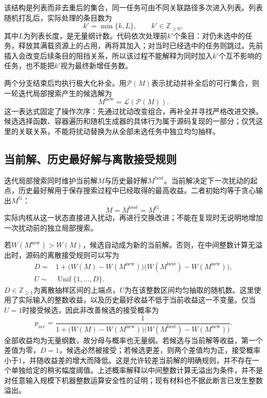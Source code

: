 该结构是列表而非去重后的集合，同一任务可由不同关联路径多次进入列表。列表随机打乱后，实际处理的条目数为
\begin{equation}
 k'=\min\{k,L\},
 \qquad k'\in\mathbb{Z}_{\geq0},
 \label{s0303:perturb_length}
\end{equation}
其中$L$为列表长度，是无量纲计数。代码依次处理前$k'$个条目：对仍未选中的任务，释放其满载资源上的占用，再将其加入；对当时已经选中的任务则跳过。先前插入会改变后续条目的阻挡关系，所以该过程不能解释为同时加入$k'$个互不影响的任务，也不能把$k'$视为最终新增任务数。

两个分支结束后均执行极大化补全。用$\mathcal{P}(M)$表示扰动并补全后的可行集合，则一轮迭代局部搜索产生的候选解为
\begin{equation}
 M^{\mathrm{new}}=\mathcal{L}(\mathcal{P}(M)).
 \label{s0303:ils_candidate}
\end{equation}
这一表达式固定了操作次序：先通过扰动改变组合，再补全并寻找严格改进交换。候选选择函数、容器遍历和随机生成器的具体行为属于源码复现的一部分；仅凭这里的关联关系，不能将扰动替换为从全部未选任务中独立均匀抽样。

\subsection{当前解、历史最好解与离散接受规则}

迭代局部搜索同时维护当前解$M$与历史最好解$M^{\mathrm{best}}$。当前解决定下一次扰动的起点，历史最好解用于保存搜索过程中已经取得的最高收益。二者初始均等于贪心输出$M^{\mathrm{G}}$：
\begin{equation}
 M=M^{\mathrm{best}}=M^{\mathrm{G}}.
 \label{s0303:initial_states}
\end{equation}
实际内核从这一状态直接进入扰动，再进行交换改进；不能在复现时无说明地增加一次扰动前的独立局部搜索。

若$W(M^{\mathrm{new}})>W(M)$，候选自动成为新的当前解。否则，在中间整数计算无溢出时，源码的离散接受规则可以写为
\begin{align}
 D={}&1+\bigl(W(M)-W(M^{\mathrm{new}})\bigr)
          \bigl(W(M^{\mathrm{best}})-W(M^{\mathrm{new}})\bigr),
 \label{s0303:accept_denominator}\\
 U\sim{}&\operatorname{Unif}\{1,\ldots,D\}.
 \label{s0303:accept_draw}
\end{align}
$D\in\mathbb{Z}_{\geq1}$为离散抽样区间的上端点，$U$为在该整数区间均匀抽取的随机数。这里使用了实际输入的整数收益，以及历史最好收益不低于当前收益这一不变量。仅当$U=1$时接受候选，因此非改善候选的接受概率为
\begin{equation}
 p_{\mathrm{acc}}=
 \frac{1}{1+\bigl(W(M)-W(M^{\mathrm{new}})\bigr)
                \bigl(W(M^{\mathrm{best}})-W(M^{\mathrm{new}})\bigr)}.
 \label{s0303:accept_probability}
\end{equation}
全部收益均为无量纲数，故分母与概率也无量纲。若候选与当前解等收益，第一个差值为零，$D=1$，候选必然被接受；若候选更差，则两个差值均为正，接受概率小于$1$，并随收益差的增大而降低。这是允许较差当前解的明确规则，并不存在一个单独给定的稍劣幅度阈值。上述概率解释以中间整数计算无溢出为条件，并不是对任意输入规模下机器整数运算安全性的证明；现有材料也不据此断言已发生整数溢出。

